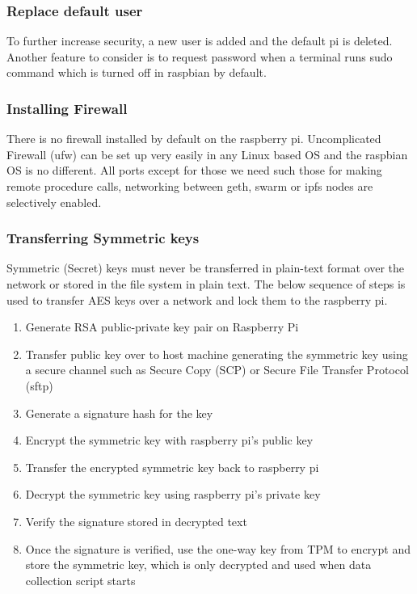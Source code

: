 \documentclass[11pt,openright]{report}
\begin{document}
\subsubsection{Replace default user}
To further increase security, a new user is added and the default pi is deleted. Another feature to consider is to request password when a terminal runs sudo command which is turned off in raspbian by default.

\subsubsection{Installing Firewall}
There is no firewall installed by default on the raspberry pi. Uncomplicated Firewall (ufw) can be set up very easily in any Linux based OS and the raspbian OS is no different. All ports except for those we need such those for making remote procedure calls, networking between geth, swarm or ipfs nodes are selectively enabled.

\subsubsection{Transferring Symmetric keys} \label{transfer_symm_keys}
Symmetric (Secret) keys must never be transferred in plain-text format over the network or stored in the file system in plain text. The below sequence of steps is used to transfer AES keys over a network and lock them to the raspberry pi.

\begin{enumerate}
    \item Generate RSA public-private key pair on Raspberry Pi
    \item Transfer public key over to host machine generating the symmetric key using a secure channel such as Secure Copy (SCP) or Secure File Transfer Protocol (sftp)
    \item Generate a signature hash for the key
    \item Encrypt the symmetric key with raspberry pi's public key
    \item Transfer the encrypted symmetric key back to raspberry pi
    \item Decrypt the symmetric key using raspberry pi's private key
    \item Verify the signature stored in decrypted text
    \item Once the signature is verified, use the one-way key from TPM to encrypt and store the symmetric key, which is only decrypted and used when data collection script starts
\end{enumerate}
\end{document}
